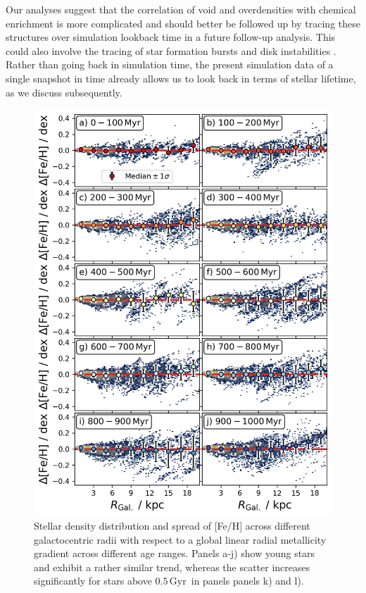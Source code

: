 \documentclass[fleqn,usenatbib]{mnras}
\newcommand{\nihaoAGEmax}{$0.5\,\mathrm{Gyr}$}
\begin{document}
Our analyses suggest that the correlation of void and overdensities with chemical enrichment is more complicated and should better be followed up by tracing these structures over simulation lookback time in a future follow-up analysis. This could also involve the tracing of star formation bursts and disk instabilities \citep{Sanchez2014, SanchezBlazquez2014, Ho2015}. Rather than going back in simulation time, the present simulation data of a single snapshot in time already allows us to look back in terms of stellar lifetime, as we discuss subsequently.

\begin{figure}
    \centering
    \includegraphics[width=\columnwidth]{figures/scatter_with_increasing_age.png}
    \caption{Stellar density distribution and spread of [Fe/H] across different galactocentric radii with respect to a global linear radial metallicity gradient across different age ranges. Panels a-j) show young stars and exhibit a rather similar trend, whereas the scatter increases significantly for stars above \nihaoAGEmax\ in panels panels k) and l).}
    \label{fig:scatter_with_increasing_age}
\end{figure}
\end{document}
